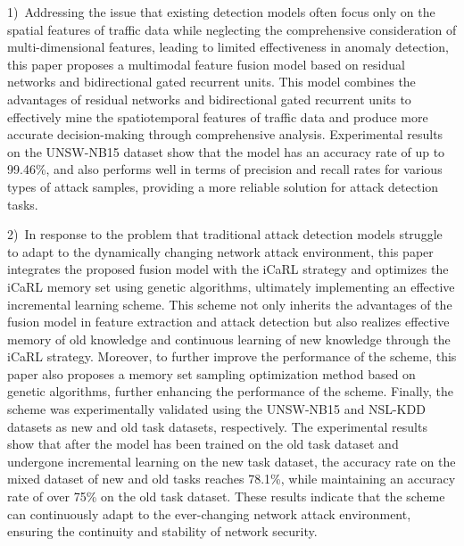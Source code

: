 \begin{eabstract}
    1)~Addressing the issue that existing detection models often focus only on the spatial features of traffic data while neglecting the comprehensive consideration of multi-dimensional features, leading to limited effectiveness in anomaly detection, this paper proposes a multimodal feature fusion model based on residual networks and bidirectional gated recurrent units. This model combines the advantages of residual networks and bidirectional gated recurrent units to effectively mine the spatiotemporal features of traffic data and produce more accurate decision-making through comprehensive analysis. Experimental results on the UNSW-NB15 dataset show that the model has an accuracy rate of up to 99.46\%, and also performs well in terms of precision and recall rates for various types of attack samples, providing a more reliable solution for attack detection tasks.
    
    2)~In response to the problem that traditional attack detection models struggle to adapt to the dynamically changing network attack environment, this paper integrates the proposed fusion model with the iCaRL strategy and optimizes the iCaRL memory set using genetic algorithms, ultimately implementing an effective incremental learning scheme. This scheme not only inherits the advantages of the fusion model in feature extraction and attack detection but also realizes effective memory of old knowledge and continuous learning of new knowledge through the iCaRL strategy. Moreover, to further improve the performance of the scheme, this paper also proposes a memory set sampling optimization method based on genetic algorithms, further enhancing the performance of the scheme. Finally, the scheme was experimentally validated using the UNSW-NB15 and NSL-KDD datasets as new and old task datasets, respectively. The experimental results show that after the model has been trained on the old task dataset and undergone incremental learning on the new task dataset, the accuracy rate on the mixed dataset of new and old tasks reaches 78.1\%, while maintaining an accuracy rate of over 75\% on the old task dataset. These results indicate that the scheme can continuously adapt to the ever-changing network attack environment, ensuring the continuity and stability of network security.
    

\end{eabstract}
